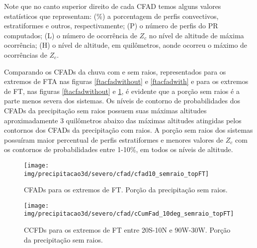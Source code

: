 Note que no canto superior direito de cada CFAD temos alguns valores estatísticos que representam: (\%)  a porcentagem de perfis convectivos, estratiformes e outros, respectivamente; (P)  o número de perfis do PR computados; (L)  o número de ocorrência de $Z_c$ no nível de altitude de máxima ocorrência; (H)  o nível de altitude, em quilômetros, aonde ocorreu o máximo de ocorrências de $Z_c$.

Comparando os CFADs da chuva com e sem raios, representados para os extremos de FTA nas figuras \ref{ftacfadwithout} e \ref{ftacfadwith} e para os extremos de FT, nas figuras \ref{ftacfadwithout} e \ref{ftcfadwithout}, é evidente que a porção sem raios é a parte menos severa dos sistemas. Os níveis de contorno de probabilidades dos CFADs da precipitação sem raios possuem suas máximas altitudes aproximadamente 3 quilômetros abaixo das máximas altitudes atingidas pelos contornos dos CFADs da precipitação com raios. A porção sem raios dos sistemas possuíram maior percentual de perfis estratiformes e menores valores de $Z_c$ com os contornos de probabilidades entre 1-10\%, em todos os níveis de altitude.



\begin{figure}[!ht]
  \centering
  \texttt{[image: img/precipitacao3d/severo/cfad/cfad10\_semraio\_topFT]}
 \caption{CFADs para os extremos de FT. Porção da precipitação sem raios.}
 \label{ftcfadwithout}
\end{figure} 

\begin{figure}[!ht]
  \centering
   {\texttt{[image: img/precipitacao3d/severo/cfad/cCumFad\_10deg\_semraio\_topFT]}}
 \caption{CCFDs para os extremos de FT entre 20S-10N e 90W-30W. Porção da precipitação sem raios.}
 \label{ftccfadwithout}
\end{figure} 







